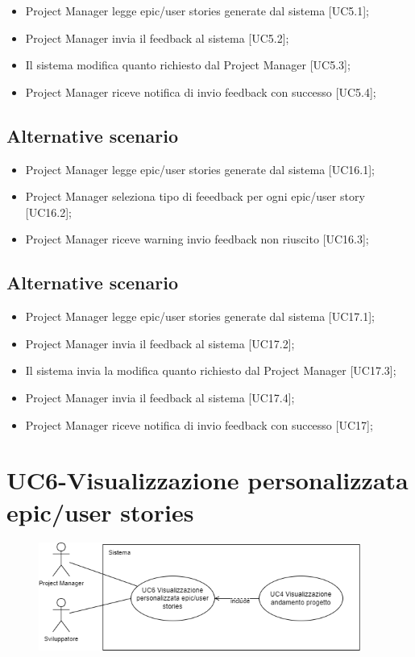 \documentclass{article}
\begin{document}
        \begin{itemize}
            \item Project Manager legge epic/user stories generate dal sistema [UC5.1];
            \item Project Manager invia il feedback al sistema [UC5.2];
            \item Il sistema modifica quanto richiesto dal Project Manager [UC5.3];
            \item Project Manager riceve notifica di invio feedback con successo [UC5.4];
        \end{itemize}
        
    \subsection*{Alternative scenario}
        
        \begin{itemize}
            \item Project Manager legge epic/user stories generate dal sistema [UC16.1];
            \item Project Manager seleziona tipo di feeedback per ogni epic/user story [UC16.2];
            \item Project Manager riceve warning invio feedback non riuscito [UC16.3];
        \end{itemize}
        
    \subsection*{Alternative scenario}      
        \begin{itemize}
            \item Project Manager legge epic/user stories generate dal sistema [UC17.1];
            \item Project Manager invia il feedback al sistema [UC17.2];
            \item Il sistema invia la modifica quanto richiesto dal Project Manager [UC17.3];
            \item Project Manager invia il feedback al sistema [UC17.4];
            \item Project Manager riceve notifica di invio feedback con successo [UC17];        
        \end{itemize}

\section{UC6-Visualizzazione personalizzata epic/user stories}
    \begin{figure}[h]
      \centering
      \includegraphics{./imgUML/UC6.png}
      \label{fig:immagine}
    \end{figure}
    
\end{document}
